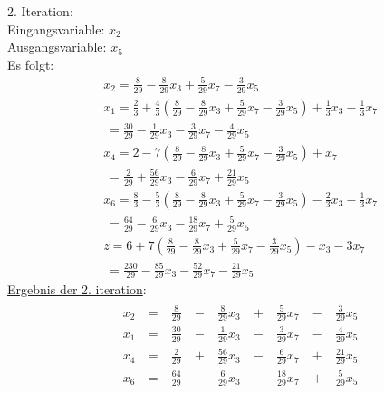 \documentclass [a4paper,11pt]{article}
\begin{document}
\begin{enumerate}
\begin{enumerate}
                2. Iteration:\\
                Eingangsvariable: $x_2$\\
                Ausgangsvariable: $x_5$\\
                Es folgt:
                \begin{align*}
                & x_2 = \frac{8}{29} - \frac{8}{29}x_3 + \frac{5}{29}x_7 - \frac{3}{29}x_5\\
                & x_1 = \frac{2}{3} + \frac{4}{3} \left( \frac{8}{29} - \frac{8}{29}x_3 + \frac{5}{29}x_7 - \frac{3}{29}x_5 \right) + \frac{1}{3}x_3 - \frac{1}{3}x_7\\
                &   \ = \frac{30}{29} - \frac{1}{29}x_3 - \frac{3}{29}x_7 - \frac{4}{29}x_5\\
                & x_4 = 2 - 7 \left( \frac{8}{29} - \frac{8}{29}x_3 + \frac{5}{29}x_7 - \frac{3}{29}x_5 \right)  + x_7 \\
                &   \ = \frac{2}{29} + \frac{56}{29}x_3 - \frac{6}{29}x_7 + \frac{21}{29}x_5\\
                & x_6 = \frac{8}{3} - \frac{5}{3} \left( \frac{8}{29} - \frac{8}{29}x_3 + \frac{5}{29}x_7 - \frac{3}{29}x_5 \right) - \frac{2}{3}x_3 - \frac{1}{3}x_7 \\
                &   \ = \frac{64}{29} - \frac{6}{29}x_3 - \frac{18}{29}x_7 + \frac{5}{29}x_5\\
                &   z = 6 + 7 \left( \frac{8}{29} - \frac{8}{29}x_3 + \frac{5}{29}x_7 - \frac{3}{29}x_5 \right) - x_3 - 3x_7\\
                &   \ = \frac{230}{29} - \frac{85}{29}x_3 - \frac{52}{29}x_7 - \frac{21}{29}x_5
                \end{align*}
                \underline{Ergebnis der 2. iteration}:
                \begin{align*}
                \begin{alignedat}{6}
                & x_2 &\ = &\ \frac{8}{29}   &\ - &\  \frac{8}{29}x_3 &\ + &\  \frac{5}{29}x_7 &\ - &\ \frac{3}{29}x_5 \\
                & x_1 &\ = &\ \frac{30}{29}  &\ - &\  \frac{1}{29}x_3 &\ - &\  \frac{3}{29}x_7 &\ - &\ \frac{4}{29}x_5 \\
                & x_4 &\ = &\ \frac{2}{29}   &\ + &\ \frac{56}{29}x_3 &\ - &\  \frac{6}{29}x_7 &\ + &\ \frac{21}{29}x_5 \\
                & x_6 &\ = &\ \frac{64}{29}  &\ - &\  \frac{6}{29}x_3 &\ - &\ \frac{18}{29}x_7 &\ + &\ \frac{5}{29}x_5 \\

\end{alignedat}
\end{align*}
\end{enumerate}
\end{enumerate}
\end{document}
